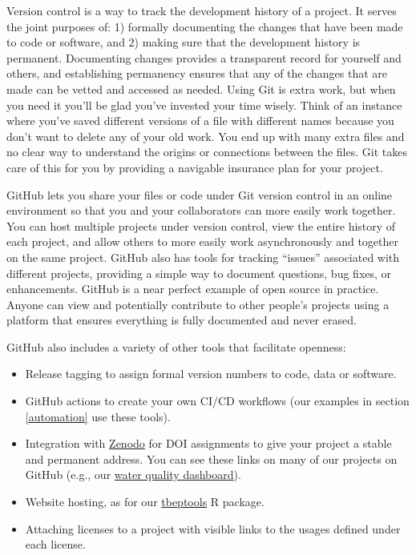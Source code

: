 \documentclass[
]{book}
\providecommand{\tightlist}{%
  \setlength{\itemsep}{0pt}\setlength{\parskip}{0pt}}
\begin{document}
Version control is a way to track the development history of a project. It serves the joint purposes of: 1) formally documenting the changes that have been made to code or software, and 2) making sure that the development history is permanent. Documenting changes provides a transparent record for yourself and others, and establishing permanency ensures that any of the changes that are made can be vetted and accessed as needed. Using Git is extra work, but when you need it you'll be glad you've invested your time wisely. Think of an instance where you've saved different versions of a file with different names because you don't want to delete any of your old work. You end up with many extra files and no clear way to understand the origins or connections between the files. Git takes care of this for you by providing a navigable insurance plan for your project.

GitHub lets you share your files or code under Git version control in an online environment so that you and your collaborators can more easily work together. You can host multiple projects under version control, view the entire history of each project, and allow others to more easily work asynchronously and together on the same project. GitHub also has tools for tracking ``issues'' associated with different projects, providing a simple way to document questions, bug fixes, or enhancements. GitHub is a near perfect example of open source in practice. Anyone can view and potentially contribute to other people's projects using a platform that ensures everything is fully documented and never erased.

GitHub also includes a variety of other tools that facilitate openness:

\begin{itemize}
\tightlist
\item
  Release tagging to assign formal version numbers to code, data or software.
\item
  GitHub actions to create your own CI/CD workflows (our examples in section \ref{automation} use these tools).
\item
  Integration with \href{https://zenodo.org/}{Zenodo} for DOI assignments to give your project a stable and permanent address. You can see these links on many of our projects on GitHub (e.g., our \href{https://github.com/tbep-tech/wq-dash}{water quality dashboard}).\\
\item
  Website hosting, as for our \href{https://tbep-tech.github.io/tbeptools/}{tbeptools} R package.
\item
  Attaching licenses to a project with visible links to the usages defined under each license.
\end{itemize}
\end{document}
